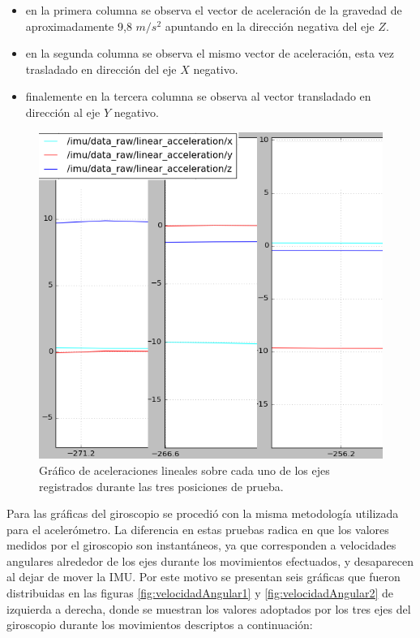 \begin{itemize}
    \item en la primera columna se observa el vector de aceleración de la gravedad de aproximadamente 9,8 $m/s^2$ apuntando en la dirección negativa del eje $Z$.
    \item en la segunda columna se observa el mismo vector de aceleración, esta vez trasladado en dirección del eje $X$ negativo.
    \item finalemente en la tercera columna se observa al vector transladado en dirección al eje $Y$ negativo.
\end{itemize}


\begin{figure}[ht]
    \centering
    \includegraphics[scale=0.4]{./Figures/linear_acceleration.png}
    \caption{Gráfico de aceleraciones lineales sobre cada uno de los ejes registrados durante las tres posiciones de prueba.}
    \label{fig:aceleracionLineal}
\end{figure}


Para las gráficas del giroscopio se procedió con la misma metodología utilizada para el acelerómetro. La diferencia en estas pruebas radica en que los valores medidos por el giroscopio son instantáneos, ya que corresponden a velocidades angulares alrededor de los ejes durante los movimientos efectuados, y desaparecen al dejar de mover la IMU. Por este motivo se presentan seis gráficas que fueron distribuidas en las figuras \ref{fig:velocidadAngular1} y \ref{fig:velocidadAngular2} de izquierda a derecha, donde se muestran los valores adoptados por los tres ejes del giroscopio durante los movimientos descriptos a continuación:


